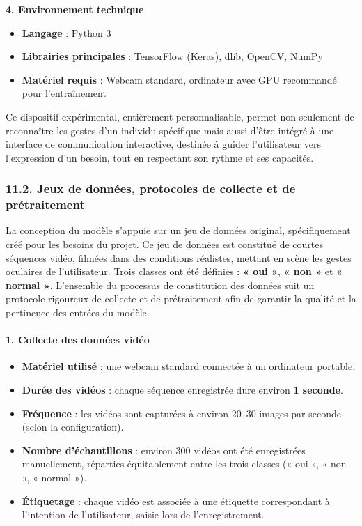 \documentclass[
]{article}
\begin{document}
\textbf{4. Environnement technique}

\begin{itemize}
\item
  \textbf{Langage} : Python 3
\item
  \textbf{Librairies principales} : TensorFlow (Keras), dlib, OpenCV, NumPy
\item
  \textbf{Matériel requis} : Webcam standard, ordinateur avec GPU recommandé pour l'entraînement
\end{itemize}

Ce dispositif expérimental, entièrement personnalisable, permet non seulement de reconnaître les gestes d'un individu spécifique mais aussi d'être intégré à une interface de communication interactive, destinée à guider l'utilisateur vers l'expression d'un besoin, tout en respectant son rythme et ses capacités.

\hypertarget{jeux-de-donnuxe9es-protocoles-de-collecte-et-de-pruxe9traitement}{%
\subsubsection{11.2. Jeux de données, protocoles de collecte et de prétraitement}\label{jeux-de-donnuxe9es-protocoles-de-collecte-et-de-pruxe9traitement}}

La conception du modèle s'appuie sur un jeu de données original, spécifiquement créé pour les besoins du projet. Ce jeu de données est constitué de courtes séquences vidéo, filmées dans des conditions réalistes, mettant en scène les gestes oculaires de l'utilisateur. Trois classes ont été définies : \textbf{« oui »}, \textbf{« non »} et \textbf{« normal »}. L'ensemble du processus de constitution des données suit un protocole rigoureux de collecte et de prétraitement afin de garantir la qualité et la pertinence des entrées du modèle.

\hypertarget{collecte-des-donnuxe9es-viduxe9o}{%
\paragraph{\texorpdfstring{\textbf{1. Collecte des données vidéo}}{1. Collecte des données vidéo}}\label{collecte-des-donnuxe9es-viduxe9o}}

\begin{itemize}
\item
  \textbf{Matériel utilisé} : une webcam standard connectée à un ordinateur portable.
\item
  \textbf{Durée des vidéos} : chaque séquence enregistrée dure environ \textbf{1 seconde}.
\item
  \textbf{Fréquence} : les vidéos sont capturées à environ 20--30 images par seconde (selon la configuration).
\item
  \textbf{Nombre d'échantillons} : environ 300 vidéos ont été enregistrées manuellement, réparties équitablement entre les trois classes (« oui », « non », « normal »).
\item
  \textbf{Étiquetage} : chaque vidéo est associée à une étiquette correspondant à l'intention de l'utilisateur, saisie lors de l'enregistrement.
\end{itemize}
\end{document}
